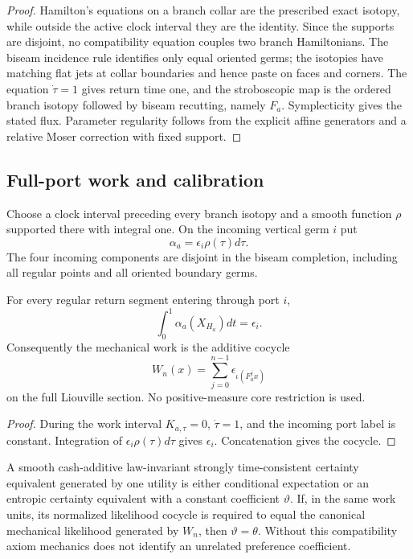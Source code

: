 \begin{proof}
Hamilton's equations on a branch collar are the prescribed exact isotopy,
while outside the active clock interval they are the identity.  Since the
supports are disjoint, no compatibility equation couples two branch
Hamiltonians.  The biseam incidence rule identifies only equal oriented germs;
the isotopies have matching flat jets at collar boundaries and hence paste on
faces and corners.  The equation $\dot\tau=1$ gives return time one, and the
stroboscopic map is the ordered branch isotopy followed by biseam recutting,
namely $F_a$.  Symplecticity gives the stated flux.  Parameter regularity
follows from the explicit affine generators and a relative Moser correction
with fixed support.
\end{proof}

\subsection{Full-port work and calibration}

Choose a clock interval preceding every branch isotopy and a smooth function
$\rho$ supported there with integral one.  On the incoming vertical germ $i$
put
\[
 \alpha_a=\epsilon_i\rho(\tau)d\tau.
\]
The four incoming components are disjoint in the biseam completion, including
all regular points and all oriented boundary germs.

\begin{proposition}
\label{prop:r7-a1-work}
For every regular return segment entering through port $i$,
\[
 \int_0^1\alpha_a(X_{H_a})dt=\epsilon_i.
\]
Consequently the mechanical work is the additive cocycle
\[
 W_n(x)=\sum_{j=0}^{n-1}\epsilon_{\iota(F_a^jx)}
\]
on the full Liouville section.  No positive-measure core restriction is used.
\end{proposition}

\begin{proof}
During the work interval $K_{a,\tau}=0$, $\dot\tau=1$, and the incoming port
label is constant.  Integration of $\epsilon_i\rho(\tau)d\tau$ gives
$\epsilon_i$.  Concatenation gives the cocycle.
\end{proof}

\begin{theorem}
\label{thm:r7-a1-calibration}
A smooth cash-additive law-invariant strongly time-consistent certainty
equivalent generated by one utility is either conditional expectation or an
entropic certainty equivalent with a constant coefficient $\vartheta$.
If, in the same work units, its normalized likelihood cocycle is required to
equal the canonical mechanical likelihood generated by $W_n$, then
$\vartheta=\theta$.  Without this compatibility axiom mechanics does not
identify an unrelated preference coefficient.
\end{theorem}

